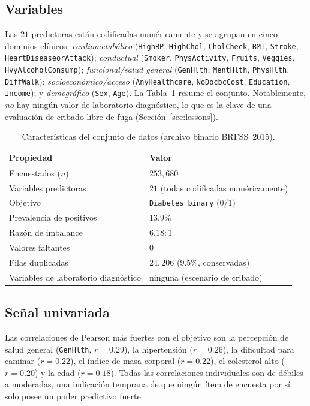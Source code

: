 \documentclass[conference]{IEEEtran}
\begin{document}
\subsection{Variables}
Las $21$ predictoras están codificadas numéricamente y se agrupan en cinco dominios
clínicos: \emph{cardiometabólico} (\texttt{HighBP}, \texttt{HighChol}, \texttt{CholCheck},
\texttt{BMI}, \texttt{Stroke}, \texttt{HeartDiseaseorAttack}); \emph{conductual}
(\texttt{Smoker}, \texttt{PhysActivity}, \texttt{Fruits}, \texttt{Veggies},
\texttt{HvyAlcoholConsump}); \emph{funcional/salud general} (\texttt{GenHlth},
\texttt{MentHlth}, \texttt{PhysHlth}, \texttt{DiffWalk}); \emph{socioeconómico/acceso}
(\texttt{AnyHealthcare}, \texttt{NoDocbcCost}, \texttt{Education}, \texttt{Income}); y
\emph{demográfico} (\texttt{Sex}, \texttt{Age}). La Tabla~\ref{tab:dataset} resume el
conjunto. Notablemente, \emph{no} hay ningún valor de laboratorio diagnóstico, lo que es la
clave de una evaluación de cribado libre de fuga (Sección~\ref{sec:lessons}).

\begin{table}[t]
\caption{Características del conjunto de datos (archivo binario BRFSS~2015).}
\label{tab:dataset}
\centering
\begin{tabular}{ll}
\toprule
Propiedad & Valor \\
\midrule
Encuestados ($n$) & $253{,}680$ \\
Variables predictoras & $21$ (todas codificadas numéricamente) \\
Objetivo & \texttt{Diabetes\_binary} ($0/1$) \\
Prevalencia de positivos & $13.9\%$ \\
Razón de imbalance & $6.18{:}1$ \\
Valores faltantes & $0$ \\
Filas duplicadas & $24{,}206$ ($9.5\%$, conservadas) \\
Variables de laboratorio diagnóstico & ninguna (escenario de cribado) \\
\bottomrule
\end{tabular}
\end{table}

\subsection{Señal univariada}
Las correlaciones de Pearson más fuertes con el objetivo son la percepción de salud general
(\texttt{GenHlth}, $r=0.29$), la hipertensión ($r=0.26$), la dificultad para caminar
($r=0.22$), el índice de masa corporal ($r=0.22$), el colesterol alto ($r=0.20$) y la edad
($r=0.18$). Todas las correlaciones individuales son de débiles a moderadas, una indicación
temprana de que ningún ítem de encuesta por sí solo posee un poder predictivo fuerte.
\end{document}
